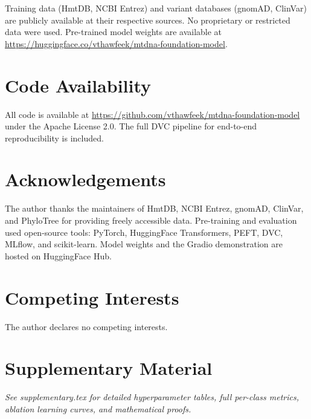 \documentclass[10pt]{article}
\begin{document}
Training data (HmtDB, NCBI Entrez) and variant databases (gnomAD, ClinVar) are publicly
available at their respective sources. No proprietary or restricted data were used. Pre-trained
model weights are available at \url{https://huggingface.co/vthawfeek/mtdna-foundation-model}.

\section*{Code Availability}

All code is available at \url{https://github.com/vthawfeek/mtdna-foundation-model} under the
Apache License 2.0. The full DVC pipeline for end-to-end reproducibility is included.

\section*{Acknowledgements}

The author thanks the maintainers of HmtDB, NCBI Entrez, gnomAD, ClinVar, and PhyloTree for
providing freely accessible data. Pre-training and evaluation used open-source tools: PyTorch,
HuggingFace Transformers, PEFT, DVC, MLflow, and scikit-learn. Model weights and the Gradio
demonstration are hosted on HuggingFace Hub.

\section*{Competing Interests}

The author declares no competing interests.




\clearpage
\appendix

\section*{Supplementary Material}
\label{sec:supplementary}

\textit{See supplementary.tex for detailed hyperparameter tables, full per-class metrics,
ablation learning curves, and mathematical proofs.}
\end{document}
